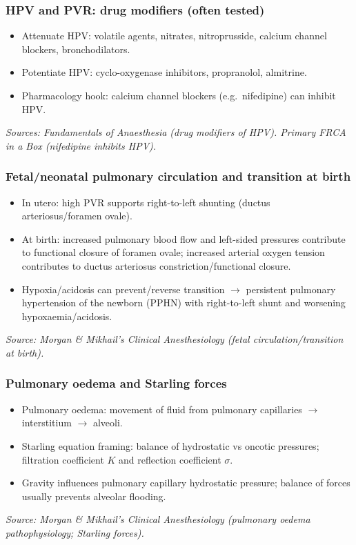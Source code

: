 \documentclass[11pt,a4paper]{article}
\begin{document}
\subsubsection{HPV and PVR: drug modifiers (often tested)}
\begin{itemize}
  \item Attenuate HPV: volatile agents, nitrates, nitroprusside, calcium channel blockers, bronchodilators.
  \item Potentiate HPV: cyclo-oxygenase inhibitors, propranolol, almitrine.
  \item Pharmacology hook: calcium channel blockers (e.g.\ nifedipine) can inhibit HPV.
\end{itemize}
\noindent\textit{Sources: Fundamentals of Anaesthesia (drug modifiers of HPV). Primary FRCA in a Box (nifedipine inhibits HPV).}

\subsubsection{Fetal/neonatal pulmonary circulation and transition at birth}
\begin{itemize}
  \item In utero: high PVR supports right-to-left shunting (ductus arteriosus/foramen ovale).
  \item At birth: increased pulmonary blood flow and left-sided pressures contribute to functional closure of foramen ovale; increased arterial oxygen tension contributes to ductus arteriosus constriction/functional closure.
  \item Hypoxia/acidosis can prevent/reverse transition \(\rightarrow\) persistent pulmonary hypertension of the newborn (PPHN) with right-to-left shunt and worsening hypoxaemia/acidosis.
\end{itemize}
\noindent\textit{Source: Morgan \& Mikhail’s Clinical Anesthesiology (fetal circulation/transition at birth).}

\subsubsection{Pulmonary oedema and Starling forces}
\begin{itemize}
  \item Pulmonary oedema: movement of fluid from pulmonary capillaries \(\rightarrow\) interstitium \(\rightarrow\) alveoli.
  \item Starling equation framing: balance of hydrostatic vs oncotic pressures; filtration coefficient \(K\) and reflection coefficient \(\sigma\).
  \item Gravity influences pulmonary capillary hydrostatic pressure; balance of forces usually prevents alveolar flooding.
\end{itemize}
\noindent\textit{Source: Morgan \& Mikhail’s Clinical Anesthesiology (pulmonary oedema pathophysiology; Starling forces).}
\end{document}
